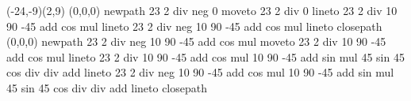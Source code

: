 \def\Rectangle(#1,#2)(#3,#4){
newpath
#1 #2 moveto
#3 #2 lineto
#3 #4 lineto
#1 #4 lineto
 closepath }

\def\cercle(#1,#2)#3{%
newpath
 #1 #2 #3 0 360 arc
closepath }

\def\ARC(#1,#2)#3#4#5{%
newpath
 #1 #2 #3 #4 #5 arc }

\def\ARCN(#1,#2)#3#4#5{%
newpath
 #1 #2 #3 #4 #5 arcn }

\def\Sombra(#1,#2){%
        \NodeIIItoIID[origine=#1 #2 0,normale=90 \BETA neg add \ALFA](-3,-1){s1}
        \NodeIIItoIID[origine=#1 #2 0,normale=90 \BETA neg add \ALFA](3,-1){s2}
        \NodeIIItoIID[origine=\s 180 \ALFA add cos mul #1 add \s 180 \ALFA add sin mul #2 add 0,normale=90 \BETA neg add \ALFA](-3,-1){s3}
        \NodeIIItoIID[origine=\s 180 \ALFA add cos mul #1 add \s 180 \ALFA add sin mul #2 add 0,normale=90 \BETA neg add \ALFA](3,-1){s4}
        \pspolygon[linecolor=gray,fillstyle=solid,fillcolor=lightgray](s1)(s3)(s4)(s2)}


\def\rad{20 }
\def\radang{\rad 1.8 div }

\def\az{60 }%
\def\el{45 }
\def\BETA{90 -\el add }
\def\ALFA{\az }

\def\W{23 }
\def\L{10 }
\def\Lns{30 }
\def\Lew{50 }
\def\TANel{\el sin \el cos div }

\def\Sa{\L \BETA cos mul }
\def\Sb{\L \BETA sin mul \TANel div  } 
\def\s{\Sa \Sb add }


	\pspicture(-24,-9)(2,9)
		\planThreeDput[normale=90 \ALFA](0,0,0){\Rectangle(\W 2 div neg,0)(\W 2 div,\Sa)}
		\planThreeDput[normale=90 \ALFA](0,0,0){\Rectangle(\W 2 div neg,\Sa)(\W 2 div,\s)}
		
